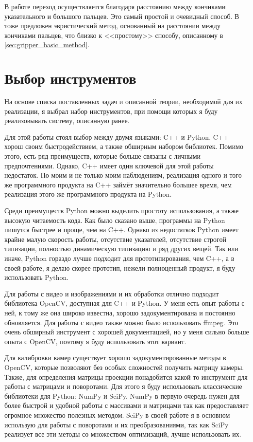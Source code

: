 \documentclass[14pt, a4paper]{extarticle}
\begin{document}
В работе \cite{literally-me} переход осуществляется благодаря расстоянию между
кончиками указательного и большого пальцев. Это самый простой и очевидный
способ. В~\cite{gesture_control} тоже предложен эвристический метод, основанный
на расстоянии между кончиками пальцев, что близко к <<простому>> способу,
описанному в \ref{sec:gripper_basic_method}.
\section{Выбор инструментов}
На основе списка поставленных задач и описанной теории, необходимой для их
реализации, я выбрал набор инструментов, при помощи которых я буду
реализовывать систему, описанную ранее.

Для этой работы стоял выбор между двумя языками: C++ и Python. 
C++ хорош своим быстродействием, а также обширным набором библиотек. Помимо
этого, есть ряд преимуществ, которые больше связаны с личными предпочтениями.
Однако, C++ имеет один ключевой для этой работы недостаток. По моим и не только
моим наблюдениям, реализация одного и того же программного продукта на C++
займёт значительно большее время, чем реализация этого же программного продукта
на Python.

Среди преимуществ Python можно выделить простоту использования, а также высокую
читаемость кода. Как было сказано выше, программы на Python пишутся быстрее и
проще, чем на C++. Однако из недостатков Python имеет крайне малую скорость
работы, отсутствие указателей, отсутствие строгой типизации, полностью
динамическую типизацию и ряд других вещей. Так или иначе, Python гораздо лучше
подходит для прототипирования, чем C++, а в своей работе, я делаю скорее
прототип, нежели полноценный продукт, я буду использовать Python.

Для работы с видео и изображениями и их обработки отлично подходит библиотека
OpenCV, доступная для C++ и Python. У меня есть опыт работы с ней, к тому же
она широко известна, хорошо задокументирована и постоянно обновляется.
Для работы с видео также можно было использовать ffmpeg\cite{ffmpeg}.
Это очень обширный инструмент с хорошей документацией, но у меня сильно больше
опыта с OpenCV, поэтому я буду использовать этот вариант.

Для калибровки камер существует хорошо задокументированные методы в
OpenCV\cite{opencv_calibration_tutorial, opencv_charuco_pose}, которые
позволяют без особых сложностей получить матрицу камеры. Также, для определения
матрицы проекции понадобится какой-то инструмент для работы с матрицами и
поворотами. Для этого я буду использовать классические библиотеки для Python:
NumPy и SciPy. NumPy в первую очередь нужен для более быстрой и удобной работы
с массивами и матрицами так как предоставляет огромное множество полезных
методом. SciPy в своей работе я в основном использую для работы с поворотами и
их преобразованиями, так как SciPy реализует все эти методы со множеством
оптимизаций, лучше использовать их.
\end{document}
